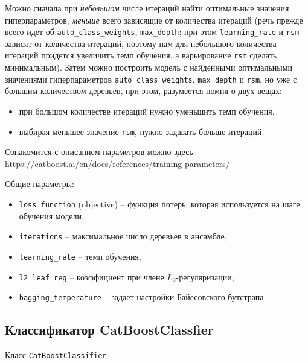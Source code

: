 \documentclass[%
	11pt,
	a4paper,
	utf8,
		]{article}
\begin{document}
Можно сначала при \emph{небольшом} числе итераций найти оптимальные значения гиперпараметров, \emph{меньше} всего зависящие от количества итераций (речь прежде всего идет об \texttt{auto\_class\_weights}, \texttt{max\_depth}; при этом \texttt{learning\_rate} и \texttt{rsm} зависят от количества итераций, поэтому нам для небольшого количества итераций придется увеличить темп обучения, а варьирование \texttt{rsm} сделать минимальным). Затем можно построить модель с найденными оптимальными значениями гиперпараметров  \texttt{auto\_class\_weights}, \texttt{max\_depth} и \texttt{rsm}, но уже с большим количеством деревьев, при этом, разумеется помня о двух вещах:
\begin{itemize}
	\item при большом количестве итераций нужно уменьшить темп обучения,
	
	\item выбирая меньшее значение \texttt{rsm}, нужно задавать больше итераций.
\end{itemize}

Ознакомится с описанием параметров можно здесь \url{https://catboost.ai/en/docs/references/training-parameters/}

Общие параметры:
\begin{itemize}
	\item \verb|loss_function| (objective) -- функция потерь, которая используется на шаге обучения модели.
	
	\item \texttt{iterations} -- максимальное число деревьев в ансамбле,
	
	\item \verb*|learning_rate| -- темп обучения,
	
	\item \verb*|l2_leaf_reg| -- коэффициент при члене $ L_2 $-регуляризации,
	
	\item \verb*|bagging_temperature| -- задает настройки Байесовского бутстрапа
\end{itemize}



\subsection{Классификатор CatBoostClassfier}

Класс \texttt{CatBoostClassifier}
\end{document}
